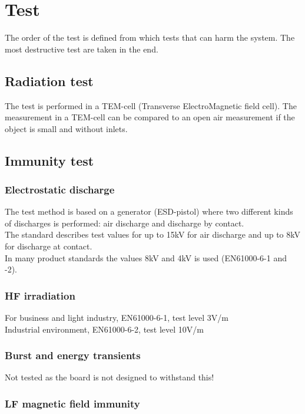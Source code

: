 \chapter{Test}
The order of the test is defined from which tests that can harm the system. The most destructive test are taken in the end. 
\section{Radiation test}
The test is performed in a TEM-cell (Transverse ElectroMagnetic field cell).
The measurement in a TEM-cell can be compared to an open air measurement if the object is small and without inlets. 


\section{Immunity test}
\subsection{Electrostatic discharge}
The test method is based on a generator (ESD-pistol) where two different kinds of discharges is performed: air discharge and discharge by contact. 
\\ The standard describes test values for up to 15kV for air discharge and up to 8kV for discharge at contact.
\\ In many product standards the values 8kV and 4kV is used (EN61000-6-1 and -2).

\subsection{HF irradiation}
For business and light industry, EN61000-6-1, test level 3V/m
\\ Industrial environment, EN61000-6-2, test level 10V/m

\subsection{Burst and energy transients}
Not tested as the board is not designed to withstand this!

\subsection{LF magnetic field immunity}


